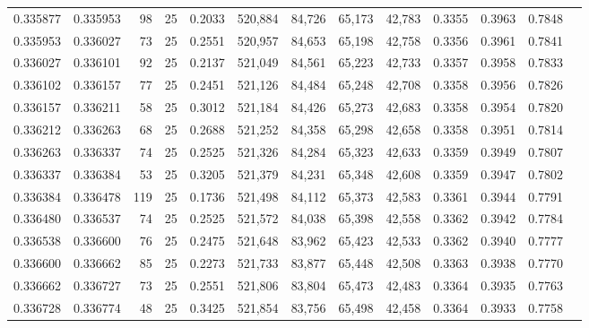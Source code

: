 \begin{tabular}{rrrrrrrrrrrrr}
0.335877 & 0.335953 &    98 &  25 &                                     0.2033 & 520,884 &  84,726 &  65,173 &  42,783 & 0.3355 & 0.3963 & 0.7848 \\
0.335953 & 0.336027 &    73 &  25 &                                     0.2551 & 520,957 &  84,653 &  65,198 &  42,758 & 0.3356 & 0.3961 & 0.7841 \\
0.336027 & 0.336101 &    92 &  25 &                                     0.2137 & 521,049 &  84,561 &  65,223 &  42,733 & 0.3357 & 0.3958 & 0.7833 \\
0.336102 & 0.336157 &    77 &  25 &                                     0.2451 & 521,126 &  84,484 &  65,248 &  42,708 & 0.3358 & 0.3956 & 0.7826 \\
0.336157 & 0.336211 &    58 &  25 &                                     0.3012 & 521,184 &  84,426 &  65,273 &  42,683 & 0.3358 & 0.3954 & 0.7820 \\
0.336212 & 0.336263 &    68 &  25 &                                     0.2688 & 521,252 &  84,358 &  65,298 &  42,658 & 0.3358 & 0.3951 & 0.7814 \\
0.336263 & 0.336337 &    74 &  25 &                                     0.2525 & 521,326 &  84,284 &  65,323 &  42,633 & 0.3359 & 0.3949 & 0.7807 \\
0.336337 & 0.336384 &    53 &  25 &                                     0.3205 & 521,379 &  84,231 &  65,348 &  42,608 & 0.3359 & 0.3947 & 0.7802 \\
0.336384 & 0.336478 &   119 &  25 &                                     0.1736 & 521,498 &  84,112 &  65,373 &  42,583 & 0.3361 & 0.3944 & 0.7791 \\
0.336480 & 0.336537 &    74 &  25 &                                     0.2525 & 521,572 &  84,038 &  65,398 &  42,558 & 0.3362 & 0.3942 & 0.7784 \\
0.336538 & 0.336600 &    76 &  25 &                                     0.2475 & 521,648 &  83,962 &  65,423 &  42,533 & 0.3362 & 0.3940 & 0.7777 \\
0.336600 & 0.336662 &    85 &  25 &                                     0.2273 & 521,733 &  83,877 &  65,448 &  42,508 & 0.3363 & 0.3938 & 0.7770 \\
0.336662 & 0.336727 &    73 &  25 &                                     0.2551 & 521,806 &  83,804 &  65,473 &  42,483 & 0.3364 & 0.3935 & 0.7763 \\
0.336728 & 0.336774 &    48 &  25 &                                     0.3425 & 521,854 &  83,756 &  65,498 &  42,458 & 0.3364 & 0.3933 & 0.7758 \\

\end{tabular}
